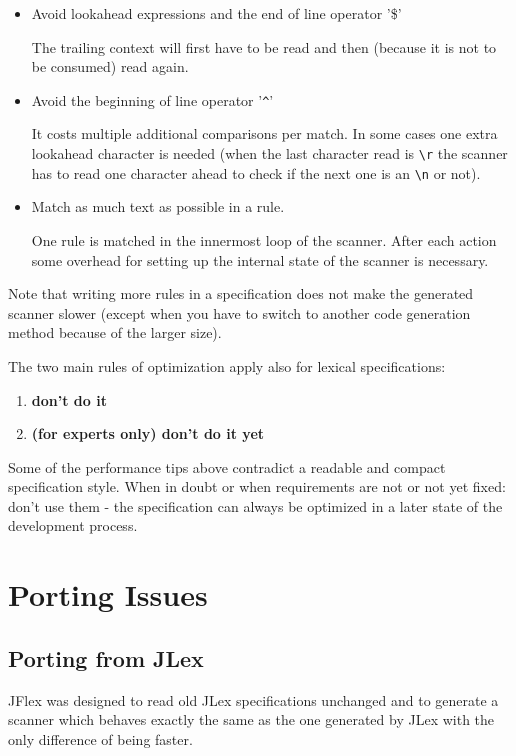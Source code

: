 \documentclass[11pt]{scrartcl}
\begin{document}
\begin{itemize}
\item
  Avoid lookahead expressions and the end of line operator '\$'

  The trailing context will first have to be read and then (because
  it is not to be consumed) read again. 

\item
  Avoid the beginning of line operator '\verb+^+'
  
  It costs multiple additional comparisons per match. In some
  cases one extra lookahead character is needed (when the last character read is
  \verb+\r+ the scanner has to read one character ahead to check if
  the next one is an \verb+\n+ or not).

\item
  Match as much text as possible in a rule.
  
  One rule is matched in the innermost loop of the scanner.  After
  each action some overhead for setting up the internal state of the
   scanner is necessary.
\end{itemize}

Note that writing more rules in a specification does not make the generated
scanner slower (except when you have to switch to another code generation
method because of the larger size).

The two main rules of optimization apply also for lexical specifications:
\begin{enumerate}
\item {\bf don't do it}
\item {\bf (for experts only) don't do it yet}
\end{enumerate}

Some of the performance tips above contradict a readable and compact
specification style. When in doubt or when requirements are not or not
yet fixed: don't use them - the specification can always be optimized
in a later state of the development process.


\section{Porting Issues}

\subsection{Porting from JLex\label{Porting}}
JFlex was designed to read old JLex specifications unchanged and to
generate a scanner which behaves exactly the same as the one generated
by JLex with the only difference of being faster.
\end{document}
